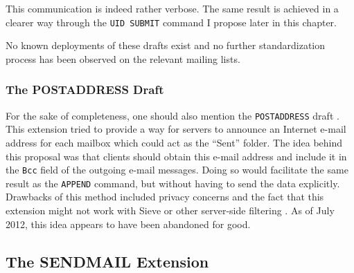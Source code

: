 \documentclass[trojita]{subfiles}
\begin{document}
This communication is indeed rather verbose.  The same result is achieved in a clearer way through the {\tt UID SUBMIT}
command I propose later in this chapter.

No known deployments of these drafts exist and no further standardization process has been observed on the relevant
mailing lists.

\subsubsection{The POSTADDRESS Draft}

For the sake of completeness, one should also mention the {\tt POSTADDRESS} draft
\cite{draft-melnikov-imap-postaddress}.  This extension tried to provide a way for servers to announce an Internet
e-mail address for each mailbox which could act as the ``Sent'' folder.  The idea behind this proposal was that clients
should obtain this e-mail address and include it in the {\tt Bcc} field of the outgoing e-mail messages.  Doing so would
facilitate the same result as the {\tt APPEND} command, but without having to send the data explicitly.  Drawbacks of
this method included privacy concerns and the fact that this extension might not work with Sieve or other server-side
filtering \cite{postaddress-sieve}.  As of July 2012, this idea appears to have been abandoned for good.

\subsection{The SENDMAIL Extension}

\end{document}
